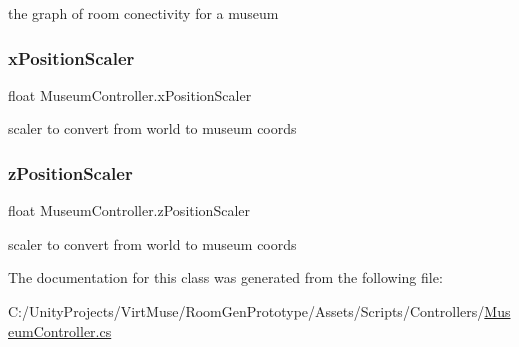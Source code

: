 the graph of room conectivity for a museum 

\mbox{\label{class_museum_controller_a48d4258798186a4c7bea39d1f522e4ca}} 
\subsubsection{\texorpdfstring{x\+Position\+Scaler}{xPositionScaler}}
{\footnotesize\ttfamily float Museum\+Controller.\+x\+Position\+Scaler\hspace{0.3cm}{\ttfamily [private]}}



scaler to convert from world to museum coords 

\mbox{\label{class_museum_controller_a8d52c606f74d7363018bd4a291b010ec}} 
\subsubsection{\texorpdfstring{z\+Position\+Scaler}{zPositionScaler}}
{\footnotesize\ttfamily float Museum\+Controller.\+z\+Position\+Scaler\hspace{0.3cm}{\ttfamily [private]}}



scaler to convert from world to museum coords 



The documentation for this class was generated from the following file\+:\begin{DoxyCompactItemize}
\item 
C\+:/\+Unity\+Projects/\+Virt\+Muse/\+Room\+Gen\+Prototype/\+Assets/\+Scripts/\+Controllers/\mbox{\hyperlink{_museum_controller_8cs}{Museum\+Controller.\+cs}}\end{DoxyCompactItemize}
